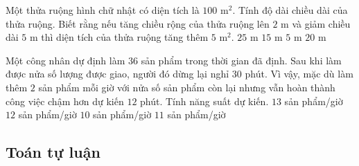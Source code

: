 \begin{bt}
	Một thửa ruộng hình chữ nhật có diện tích là $100$ m$^2$. Tính độ dài chiều dài của thửa ruộng. Biết rằng nếu tăng chiều rộng của thửa ruộng lên $2$ m và giảm chiều dài $5$ m thì diện tích của thửa ruộng tăng thêm $5 $ m$^2$.
	\choice
	{$25$ m}
	{$15$ m}
	{$5$ m}
	{\True $20$ m}
\end{bt}

\begin{bt}
	Một công nhân dự định làm $36$ sản phẩm trong thời gian đã định. Sau khi làm được nửa số lượng được giao, người đó dừng lại  nghỉ $30$ phút. Vì vậy, mặc dù làm thêm $2$ sản phẩm mỗi giờ với nửa số sản phẩm còn lại nhưng vẫn hoàn thành công việc chậm hơn dự kiến $12$ phút. Tính năng suất dự kiến.
	\choice
	{$13$ sản phẩm/giờ}
	{$12$ sản phẩm/giờ}
	{\True $10$ sản phẩm/giờ}
	{$11$ sản phẩm/giờ}
\end{bt}
\subsection{Toán tự luận}
